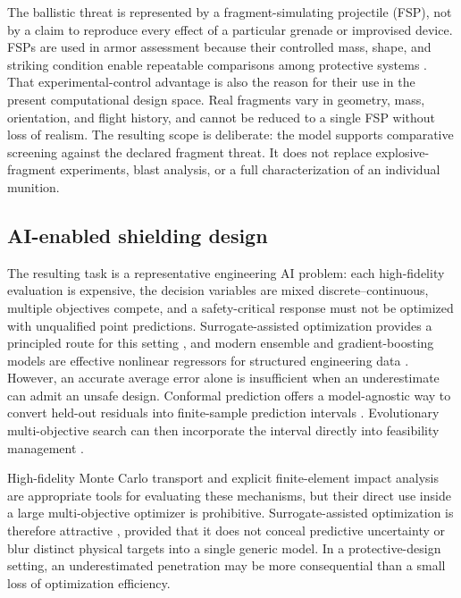 \documentclass[12pt]{elsarticle}
\begin{document}
	The ballistic threat is represented by a fragment-simulating projectile (FSP), not by a claim to reproduce every effect of a particular grenade or improvised device. FSPs are used in armor assessment because their controlled mass, shape, and striking condition enable repeatable comparisons among protective systems \cite{CantEtAl2015FSP}. That experimental-control advantage is also the reason for their use in the present computational design space. Real fragments vary in geometry, mass, orientation, and flight history, and cannot be reduced to a single FSP without loss of realism. The resulting scope is deliberate: the model supports comparative screening against the declared fragment threat. It does not replace explosive-fragment experiments, blast analysis, or a full characterization of an individual munition.
	
	\subsection{AI-enabled shielding design}

	The resulting task is a representative engineering AI problem: each high-fidelity evaluation is expensive, the decision variables are mixed discrete--continuous, multiple objectives compete, and a safety-critical response must not be optimized with unqualified point predictions. Surrogate-assisted optimization provides a principled route for this setting \cite{Forrester2008Surrogate}, and modern ensemble and gradient-boosting models are effective nonlinear regressors for structured engineering data \cite{Breiman2001RF,Geurts2006ExtraTrees,Friedman2001GBM,ChenGuestrin2016XGBoost}. However, an accurate average error alone is insufficient when an underestimate can admit an unsafe design. Conformal prediction offers a model-agnostic way to convert held-out residuals into finite-sample prediction intervals \cite{Vovk2005Conformal,Lei2018Conformal}. Evolutionary multi-objective search can then incorporate the interval directly into feasibility management \cite{Deb2002NSGAII,Deb2000Constraints,EmmerichDeutz2018}.
	
	High-fidelity Monte Carlo transport and explicit finite-element impact analysis are appropriate tools for evaluating these mechanisms, but their direct use inside a large multi-objective optimizer is prohibitive. Surrogate-assisted optimization is therefore attractive \cite{Forrester2008Surrogate}, provided that it does not conceal predictive uncertainty or blur distinct physical targets into a single generic model. In a protective-design setting, an underestimated penetration may be more consequential than a small loss of optimization efficiency.
	
\end{document}
